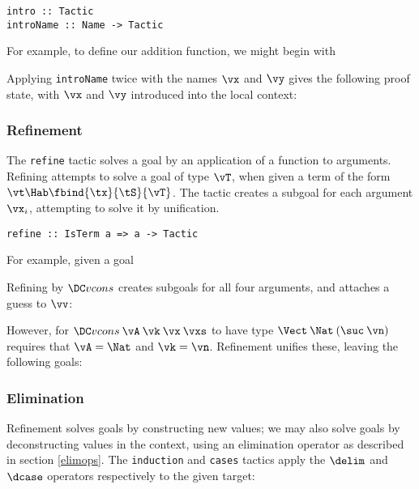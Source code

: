 \begin{verbatim}
intro :: Tactic
introName :: Name -> Tactic
\end{verbatim}

For example, to define our addition function, we might begin with


Applying \texttt{introName} twice with the names $\vx$ and $\vy$ gives
the following proof state, with $\vx$ and $\vy$ introduced into the
local context:

\subsubsection{Refinement}
The \texttt{refine} tactic solves a goal by an application of a
function to arguments. Refining attempts to solve a goal of type
$\vT$, when given a term of the form $\vt\Hab\fbind{\tx}{\tS}{\vT}$. The tactic
creates a subgoal for each argument $\vx_i$, attempting to solve it by
unification.

\begin{verbatim}
refine :: IsTerm a => a -> Tactic
\end{verbatim}

For example, given a goal
\DM{
\Axiom{
\hole{\vv}{\Vect\:\Nat\:(\suc\:\vn)}}
}

Refining by $\Vcons$ creates subgoals for all four arguments, and
attaches a guess to $\vv$:
\DM{
\Axiom{
\AR{
\hole{\vA}{\Type}\\
\hole{\vk}{\Nat}\\
\hole{\vx}{\vA}\\
\hole{\vxs}{\Vect\:\vA\:\vk}\\
\guess{\vv}{\Vect\:\Nat\:(\suc\:\vn)}{\Vcons\:\vA\:\vk\:\vx\:\vxs}
}
}
}

However, for $\Vcons\:\vA\:\vk\:\vx\:\vxs$ to have type
$\Vect\:\Nat\:(\suc\:\vn)$ requires that $\vA=\Nat$ and $\vk=\vn$.
Refinement unifies these, leaving the
following goals:
\DM{
\Axiom{
\AR{
\hole{\vx}{\Nat}\\
\hole{\vxs}{\Vect\:\Nat\:\vn}\\
\guess{\vv}{\Vect\:\Nat\:(\suc\:\vn)}{\Vcons\:\Nat\:\vn\:\vx\:\vxs}
}
}
}


\subsubsection{Elimination}
Refinement solves goals by constructing new values; we may also solve
goals by deconstructing values in the context, using an elimination
operator as described in section \ref{elimops}. The \texttt{induction}
and \texttt{cases} tactics apply the $\delim$ and $\dcase$ operators
respectively to the given target:

